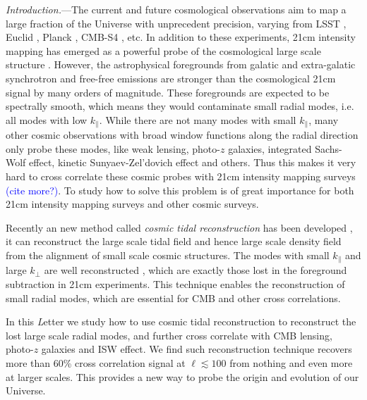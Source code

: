 \documentclass[aps,prl,twocolumn,showpacs,superscriptaddress,groupedaddress,nofootinbib]{revtex4}  %
\newcommand{\tcb}{\textcolor{blue}}
\begin{document}
\pacs{}
\maketitle

{\it Introduction.}---The current and future cosmological observations aim
to map a large fraction of the Universe with unprecedent precision, varying
from LSST \cite{2009:lsst}, Euclid \cite{2011:euclid}\cite{2012:euclid}, 
Planck \cite{2015arXiv150201582P}, CMB-S4 \cite{2014ApJ...788..138W}\cite{2013arXiv1309.5383A}, etc. 
In addition to these
experiments, 21cm intensity mapping has emerged as a powerful probe of the 
cosmological large scale structure \cite{2008:21cm}\cite{chang}.
However, the astrophysical foregrounds from galatic and extra-galatic 
synchrotron and free-free emissions are stronger than the cosmological 21cm 
signal by many orders of magnitude. These foregrounds are expected to be 
spectrally smooth, which means they would contaminate small radial
modes, i.e. all modes with low $k_\parallel$.
While there are not many modes with small $k_\parallel$, many other cosmic
observations with broad window functions along the radial direction only 
probe these modes, like weak lensing, photo-$z$ galaxies, 
integrated Sachs-Wolf effect, kinetic Sunyaev-Zel'dovich effect and others.  
Thus this makes it very hard to cross correlate these cosmic probes with 
21cm intensity mapping surveys 
\cite{2007ApJ...660.1030F}\cite{2008MNRAS.384..291A} \tcb{(cite more?)}. 
To study how to solve this problem is of great importance for both 21cm 
intensity mapping surveys and other cosmic surveys.

Recently an new method called {\it cosmic tidal reconstruction} has been 
developed \cite{2012:pen}\cite{2015:zhu}, it can reconstruct the large scale 
tidal field and hence large scale density field from the alignment of small 
scale cosmic structures.
The modes with small $k_\parallel$ and large $k_\perp$ are well 
reconstructed \cite{2015:zhu}, which are exactly those lost in the foreground 
subtraction in 21cm experiments. 
This technique enables the reconstruction of small radial modes, which are 
essential for CMB and other cross correlations.

In this {\emph Letter} we study how to use cosmic tidal reconstruction to 
reconstruct the lost large scale radial modes, and further cross correlate with
CMB lensing, photo-$z$ galaxies and ISW effect. 
We find such reconstruction technique recovers more than 60\% cross correlation 
signal at $\ell\lesssim100$ from nothing and even more at larger scales. 
This provides a new way to probe the origin and evolution of our Universe.
\end{document}
